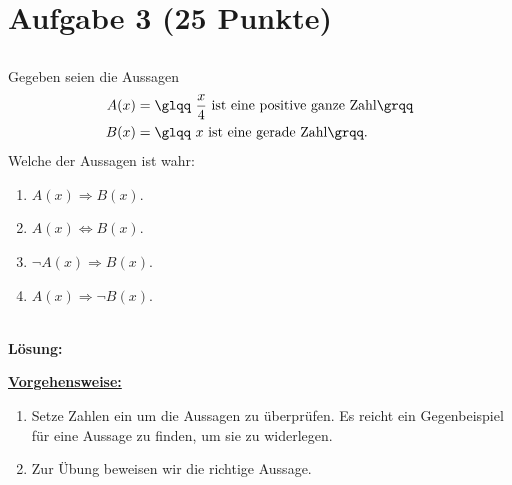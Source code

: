 \section*{Aufgabe 3 (25 Punkte)}
\vspace{0.4cm}
\subsection*{}
Gegeben seien die Aussagen
\begin{align*}
A(x) &= \text{\glqq $\frac{x}{4}$ ist eine positive ganze Zahl\grqq}\\
B(x) &= \text{\glqq $x$ ist eine gerade Zahl\grqq}.
\end{align*}
Welche der Aussagen ist wahr:
\renewcommand{\labelenumi}{(\alph{enumi})}
\begin{enumerate}
\item $A(x) \Rightarrow B(x)$.
\item $A(x) \Leftrightarrow B(x)$.
\item $\neg A(x) \Rightarrow B(x)$.
\item $A(x) \Rightarrow \neg B(x)$.
\end{enumerate}
\ \\
\textbf{Lösung:}
\begin{mdframed}
\underline{\textbf{Vorgehensweise:}}
\renewcommand{\labelenumi}{\theenumi.}
\begin{enumerate}
\item Setze Zahlen ein um die Aussagen zu überprüfen.
Es reicht ein Gegenbeispiel für eine Aussage zu finden, um sie zu widerlegen.
\item Zur Übung beweisen wir die richtige Aussage.
\end{enumerate}
\end{mdframed}

